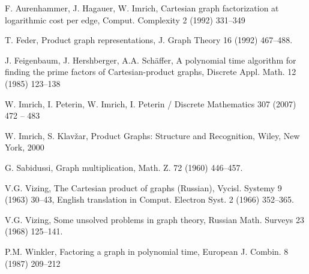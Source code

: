 \documentclass[12pt,a4paper,titlepage]{article}
\begin{document}
\newpage
\begin{thebibliography}{99}
 F. Aurenhammer, J. Hagauer, W. Imrich, 
Cartesian graph factorization at logarithmic cost per edge, Comput. Complexity 2 (1992) 331–349

 T. Feder, 
Product graph representations, J. Graph Theory 16 (1992) 467–488.

 J. Feigenbaum, J. Hershberger, A.A. Schäffer, 
A polynomial time algorithm for finding the prime factors of Cartesian-product graphs, Discrete Appl. Math. 12 (1985) 123–138

 W. Imrich, I. Peterin, 
W. Imrich, I. Peterin / Discrete Mathematics 307 (2007) 472 – 483

 W. Imrich, S. Klavžar, 
Product Graphs: Structure and Recognition, Wiley, New York, 2000

 G. Sabidussi,
Graph multiplication, Math. Z. 72 (1960) 446–457.

 V.G. Vizing,
The Cartesian product of graphs (Russian), Vycisl. Systemy 9 (1963) 30–43, English translation in Comput. Electron Syst. 2 (1966) 352–365.

 V.G. Vizing, 
Some unsolved problems in graph theory, Russian Math. Surveys 23 (1968) 125–141.

 P.M. Winkler, 
Factoring a graph in polynomial time, European J. Combin. 8 (1987) 209–212
\end{thebibliography}
\end{document}

